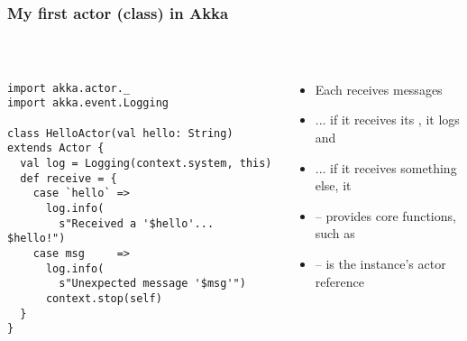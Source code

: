 \documentclass[aspectratio=169]{beamer}
\begin{document}
\begin{frame}[fragile]\frametitle{My first actor (class) in Akka}
~\\[-8mm]
\begin{columns}
\begin{column}{0.56\textwidth}
\begin{lstlisting}[emph={Actor, Logging, receive, system,stop}]
import akka.actor._
import akka.event.Logging

class HelloActor(val hello: String) extends Actor {
  val log = Logging(context.system, this)
  def receive = {
    case `hello` =>
      log.info(
        s"Received a '$hello'... $hello!")
    case msg     =>
      log.info(
        s"Unexpected message '$msg'")
      context.stop(self)
  }
}
\end{lstlisting}
\end{column}
\begin{column}{0.44\textwidth}
\begin{itemize}
  \item Each  receives messages
  \item ... if it receives its , it logs and 
  \item ... if it receives something else, it 
  \item {} -- provides core functions, such as 
  \item {} -- is the instance's actor reference
\end{itemize}
\end{column}
\end{columns}
\end{frame}
\end{document}
